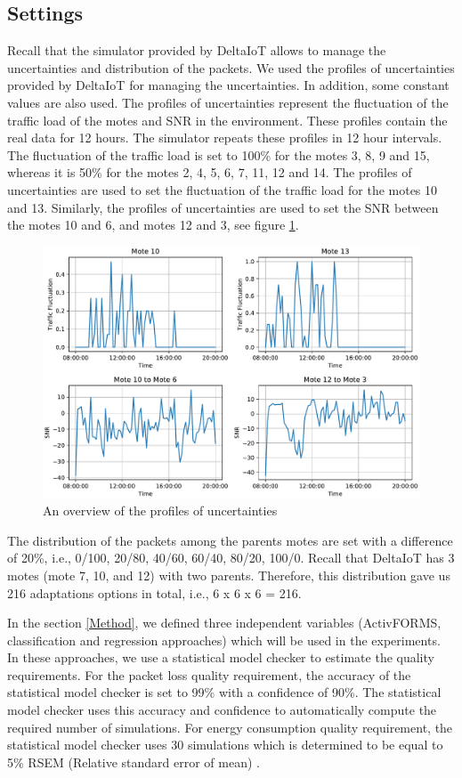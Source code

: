 \documentclass[a4paper,12pt]{article}
\begin{document}
\subsection{Settings} \label{Settings}
Recall that the simulator provided by DeltaIoT allows to manage the uncertainties and distribution of the packets. We used the profiles of uncertainties provided by DeltaIoT for managing the uncertainties. In addition, some constant values are also used. The profiles of uncertainties represent the fluctuation of the traffic load of the motes and SNR in the environment. These profiles contain the real data for 12 hours. The simulator repeats these profiles in 12 hour intervals. The fluctuation of the traffic load is set to 100\% for the motes 3, 8, 9 and 15, whereas it is 50\% for the motes 2, 4, 5, 6, 7, 11, 12 and 14. The profiles of uncertainties are used to set the fluctuation of the traffic load for the motes 10 and 13. Similarly, the profiles of uncertainties are used to set the SNR between the motes 10 and 6, and motes 12 and 3, see figure \ref{Profiles}.
\begin{figure}[H]
	\centering
	\includegraphics[keepaspectratio, width=\linewidth]{graphs/Profiles.pdf}
	\caption{An overview of the profiles of uncertainties}
	\label{Profiles}
\end{figure}
The distribution of the packets among the parents motes are set with a difference of 20\%, i.e., 0/100, 20/80, 40/60, 60/40, 80/20, 100/0. Recall that  DeltaIoT has 3 motes (mote 7, 10, and 12) with two parents. Therefore, this distribution gave us 216 adaptations options in total, i.e., 6 x 6 x 6 = 216.

In the section \ref{Method}, we defined three independent variables (ActivFORMS, classification and regression approaches) which will be used in the experiments. In these approaches, we use a statistical model checker to estimate the quality requirements. For the packet loss quality requirement, the accuracy of the statistical model checker is set to 99\% with a confidence of 90\%. The statistical model checker uses this accuracy and confidence to automatically compute the required number of simulations. For energy consumption quality requirement, the statistical model checker uses 30 simulations which is determined to be equal to 5\% RSEM (Relative standard error of mean) \cite{AMBATESASWG-2017}. 
\end{document}
